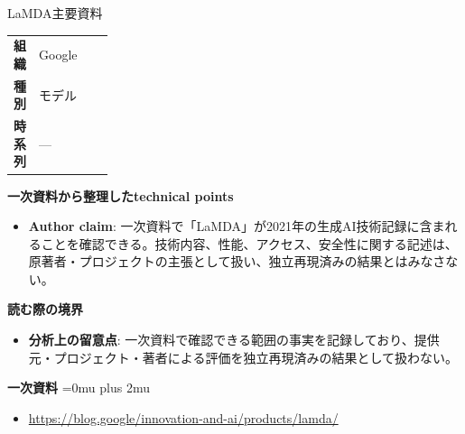 \begin{technicalnote}{LaMDA}{主要資料}
\begingroup
\begin{tabularx}{\linewidth}{@{}>{\bfseries}p{0.22\linewidth}X@{}}
組織 & Google \\
種別 & モデル \\
時系列 & — \\
\end{tabularx}
\smallskip
{\bfseries 一次資料から整理したtechnical points}
\begin{itemize}[leftmargin=1.5em,itemsep=0.35em]
\item \textbf{Author claim}: 一次資料で「LaMDA」が2021年の生成AI技術記録に含まれることを確認できる。技術内容、性能、アクセス、安全性に関する記述は、原著者・プロジェクトの主張として扱い、独立再現済みの結果とはみなさない。
\end{itemize}
\begin{minipage}{\linewidth}
{\bfseries 読む際の境界}
\begin{itemize}[leftmargin=1.5em,itemsep=0.35em]
\item \textbf{分析上の留意点}: 一次資料で確認できる範囲の事実を記録しており、提供元・プロジェクト・著者による評価を独立再現済みの結果として扱わない。
\end{itemize}
\begin{samepage}
{\bfseries 一次資料}
\begingroup\sloppy
\Urlmuskip=0mu plus 2mu\relax
\begin{itemize}[leftmargin=1.5em,itemsep=0.25em]
\item {\scriptsize\url{https://blog.google/innovation-and-ai/products/lamda/}}
\end{itemize}
\endgroup
\end{samepage}
\end{minipage}
\endgroup
\end{technicalnote}
\medskip


